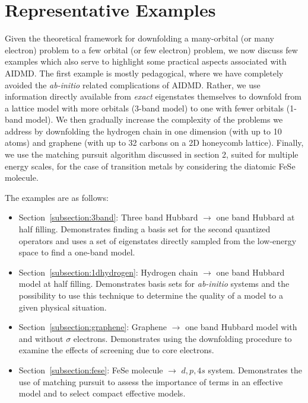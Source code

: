 \section{Representative Examples}

Given the theoretical framework for downfolding a many-orbital (or many electron) problem to a 
few orbital (or few electron) problem, we now discuss few examples which also serve to highlight some practical aspects 
associated with AIDMD. The first example is mostly pedagogical, 
where we have completely avoided the \textit{ab-initio} related complications of AIDMD. Rather, we use information directly available 
from \textit{exact} eigenstates themselves to downfold from a lattice model with more orbitals (3-band model) 
to one with fewer orbitals (1-band model). We then gradually increase the complexity of the problems we address 
by downfolding the hydrogen chain in one dimension (with up to 10 atoms) and graphene 
(with up to 32 carbons on a 2D honeycomb lattice). Finally, we use the matching pursuit algorithm discussed 
in section 2, suited for multiple energy scales, for the case of transition metals 
by considering the diatomic FeSe molecule.

  
The examples are as follows:
\begin{itemize}
\item Section~\ref{subsection:3band}: Three band Hubbard $\rightarrow$ one band Hubbard at half filling. Demonstrates finding a basis set for the second quantized operators and uses a set of eigenstates directly sampled from the low-energy space to find a one-band model.
\item Section~\ref{subsection:1dhydrogen}: Hydrogen chain $\rightarrow$ one band Hubbard model at half filling. Demonstrates basis sets for {\it ab-initio} systems and the possibility to use this technique to determine the quality of a model to a given physical situation.
\item Section~\ref{subsection:graphene}: Graphene $\rightarrow$ one band Hubbard model with and without $\sigma$ electrons. Demonstrates using the downfolding procedure to examine the effects of screening due to core electrons. 
\item Section~\ref{subsection:fese}: FeSe molecule $\rightarrow$ $d,p,4s$ system. Demonstrates the use of matching pursuit to assess the importance of terms in an effective model and to select compact effective models.
\end{itemize}



